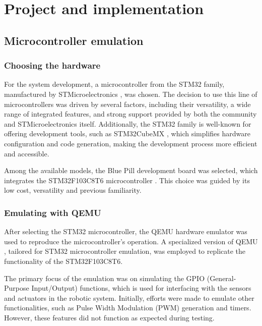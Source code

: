 \documentclass[../../monografia.tex]{subfiles}
\begin{document}
\section{Project and implementation}

\subsection{Microcontroller emulation}

\subsubsection{Choosing the hardware}

For the system development, a microcontroller from the STM32 family, manufactured by STMicroelectronics \cite{STMicroelectronics_23}, was chosen. The decision to use this line of microcontrollers was driven by several factors, including their versatility, a wide range of integrated features, and strong support provided by both the community and STMicroelectronics itself. Additionally, the STM32 family is well-known for offering development tools, such as STM32CubeMX \cite{STM32CubeMX_23}, which simplifies hardware configuration and code generation, making the development process more efficient and accessible. 

Among the available models, the Blue Pill \cite{BluePill_23} development board was selected, which integrates the STM32F103C8T6 microcontroller \cite{STM32F103C8T6_Datasheet_23}. This choice was guided by its low cost, versatility and previous familiarity.

\subsubsection{Emulating with QEMU}

After selecting the STM32 microcontroller, the QEMU hardware emulator was used to reproduce the microcontroller’s operation. A specialized version of QEMU \cite{QEMU_STM32_23}, tailored for STM32 microcontroller emulation, was employed to replicate the functionality of the STM32F103C8T6.

The primary focus of the emulation was on simulating the GPIO (General-Purpose Input/Output) functions, which is used for interfacing with the sensors and actuators in the robotic system. Initially, efforts were made to emulate other functionalities, such as Pulse Width Modulation (PWM) generation and timers. However, these features did not function as expected during testing.
\end{document}
